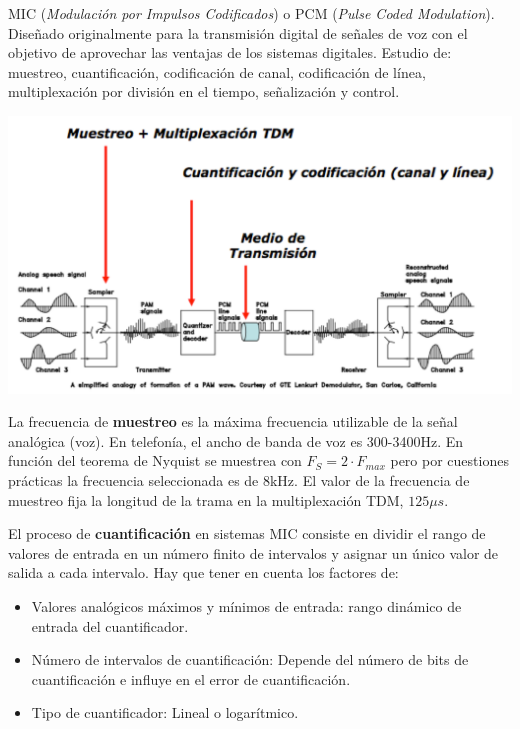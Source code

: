 \documentclass[10pt,portrait, twocolumn]{article}
\makeatletter
\renewcommand{\subsubsection}{\@startsection{subsubsection}{3}{0mm}%
                                {-1ex plus -.5ex minus -.2ex}%
                                {1ex plus .2ex}%
                                {\normalfont\small\bfseries}}
\makeatother
\begin{document}
MIC (\textit{Modulación por Impulsos Codificados}) o PCM (\textit{Pulse Coded Modulation}). Diseñado originalmente para la transmisión digital de señales de voz con el objetivo de aprovechar las ventajas de los sistemas digitales. Estudio de: muestreo, cuantificación, codificación de canal, codificación de línea, multiplexación por división en el tiempo, señalización y control.

	\begin{center}
		\includegraphics[scale=0.45]{images/SistemasMIC}
	\end{center}	
	

La frecuencia de \textbf{muestreo} es la máxima frecuencia utilizable de la señal analógica (voz). En telefonía, el ancho de banda de voz es 300-3400Hz. En función del teorema de Nyquist se muestrea con $F_{S} = 2 \cdot F_{max}$ pero por cuestiones prácticas la frecuencia seleccionada es de 8kHz. El valor de la frecuencia de muestreo fija la longitud de la trama en la multiplexación TDM, $125\mu s$.


El proceso de \textbf{cuantificación} en sistemas MIC consiste en dividir el rango de valores de entrada en un número finito de intervalos y asignar un único valor de salida a cada intervalo. Hay que tener en cuenta los factores de:

	\begin{itemize}
		\item Valores analógicos máximos y mínimos de entrada: rango dinámico de entrada del cuantificador.
		\item Número de intervalos de cuantificación: Depende del número de bits de cuantificación e influye en el error de cuantificación.
		\item Tipo de cuantificador: Lineal o logarítmico.
	\end{itemize}
\end{document}
